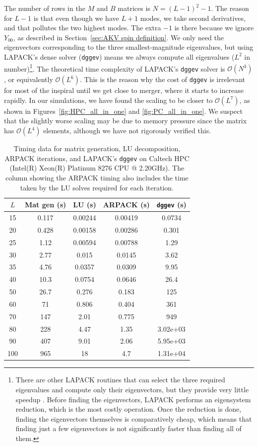 \documentclass{iopjournal}
\begin{document}
The number of rows in the $M$ and $B$ matrices is $N = (L-1)^2 -1$. The reason for $L-1$ is that even though we have $L+1$ modes, we take second derivatives, and that pollutes the two highest modes. The extra $-1$ is there because we ignore $Y_{00}$, as described in Section~\ref{sec:AKV spin definition}. We only need the eigenvectors corresponding to the three smallest-magnitude eigenvalues, but using LAPACK's dense solver (\texttt{dggev}) means we always compute all eigenvalues ($L^2$ in number)\footnote{There are other LAPACK routines that can select the three required eigenvalues and compute only their eigenvectors, but they provide very little speedup \cite[Sec.~3.4.3]{lapack_users_guide}. Before finding the eigenvectors, LAPACK performs an eigensystem reduction, which is the most costly operation. Once the reduction is done, finding the eigenvectors themselves is comparatively cheap, which means that finding just a few eigenvectors is not significantly faster than finding all of them.}. The theoretical time complexity of LAPACK's \texttt{dggev} solver is $\mathcal{O}(N^3)$, or equivalently $\mathcal{O}(L^6)$. This is the reason why the cost of \texttt{dggev} is irrelevant for most of the inspiral until we get close to merger, where it starts to increase rapidly. In our simulations, we have found the scaling to be closer to $\mathcal{O}(L^7)$, as shown in Figures~\ref{fig:HPC_all_in_one} and \ref{fig:PC_all_in_one}. We suspect that the slightly worse scaling may be due to memory pressure since the matrix has $\mathcal{O}(L^4)$ elements, although we have not rigorously verified this.

\begin{table}[h]
\centering
\begin{tabular}{c c c c c}
\toprule
$L$ & Mat gen (s) & LU (s) & ARPACK (s) & \texttt{dggev} (s) \\
\midrule
15 & 0.117 & 0.00244 & 0.00419 & 0.0734 \\
20 & 0.428 & 0.00158 & 0.00286 & 0.301 \\
25 & 1.12 & 0.00594 & 0.00788 & 1.29 \\
30 & 2.77 & 0.015 & 0.0145 & 3.62 \\
35 & 4.76 & 0.0357 & 0.0309 & 9.95 \\
40 & 10.3 & 0.0754 & 0.0646 & 26.4 \\
50 & 26.7 & 0.276 & 0.183 & 125 \\
60 & 71 & 0.806 & 0.404 & 361 \\
70 & 147 & 2.01 & 0.775 & 949 \\
80 & 228 & 4.47 & 1.35 & 3.02e+03 \\
90 & 407 & 9.01 & 2.06 & 5.95e+03 \\
100 & 965 & 18 & 4.7 & 1.31e+04 \\
\bottomrule
\end{tabular}
\caption{Timing data for matrix generation, LU decomposition, ARPACK iterations, and LAPACK's \texttt{dggev} on Caltech HPC (Intel(R) Xeon(R) Platinum 8276 CPU @ 2.20GHz). The column showing the ARPACK timing also includes the time taken by the LU solves required for each iteration.}
\label{table:timing_data_HPC}
\end{table}
\end{document}
